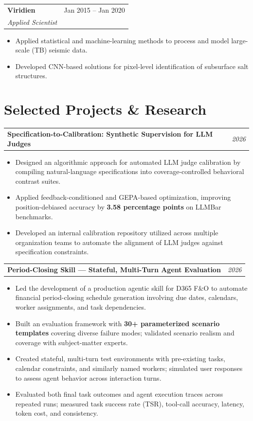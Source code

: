 \documentclass[10pt,letterpaper]{article}
\makeatletter
\newcommand{\heading}[2]{\vspace{2pt}\begin{tabularx}{\textwidth}{@{}Xr@{}}\textbf{#1} & \textit{#2}\end{tabularx}\vspace{-0pt}}
\newcommand{\headingwtitle}[3]{\vspace{2pt}\begin{tabularx}{\textwidth}{@{}Xr@{}}\textbf{#1} & #3\\[1pt] \textit{#2} & \end{tabularx}\vspace{-0pt}}
\makeatother
\begin{document}
\headingwtitle{Viridien}{Applied Scientist}{Jan 2015 -- Jan 2020}
\begin{itemize}
\item Applied statistical and machine-learning methods to process and model large-scale (TB) seismic data.
\item Developed CNN-based solutions for pixel-level identification of subsurface salt structures.
\end{itemize}

\section*{Selected Projects \& Research}

\heading{Specification-to-Calibration: Synthetic Supervision for LLM Judges}{2026}
\begin{itemize}
\item Designed an algorithmic approach for automated LLM judge calibration by compiling natural-language specifications into coverage-controlled behavioral contrast suites.
\item Applied feedback-conditioned and GEPA-based optimization, improving position-debiased accuracy by \textbf{3.58 percentage points} on LLMBar benchmarks.
\item Developed an internal calibration repository utilized across multiple organization teams to automate the alignment of LLM judges against specification constraints.


\end{itemize}

\heading{Period-Closing Skill --- Stateful, Multi-Turn Agent Evaluation}{2026}
\begin{itemize}
\item Led the development of a production agentic skill for D365 F\&O to automate financial period-closing schedule generation involving due dates, calendars, worker assignments, and task dependencies.
\item Built an evaluation framework with \textbf{30+ parameterized scenario templates} covering diverse failure modes; validated scenario realism and coverage with subject-matter experts.
\item Created stateful, multi-turn test environments with pre-existing tasks, calendar constraints, and similarly named workers; simulated user responses to assess agent behavior across interaction turns.
\item Evaluated both final task outcomes and agent execution traces across repeated runs; measured task success rate (TSR), tool-call accuracy, latency, token cost, and consistency.
\end{itemize}
\end{document}
